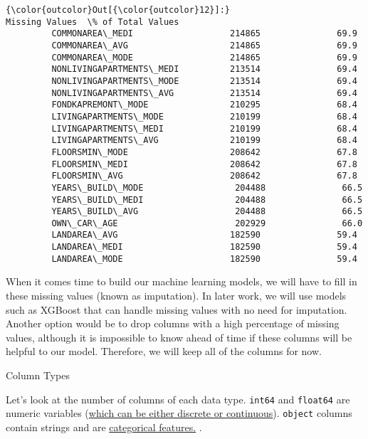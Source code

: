 \documentclass[11pt]{article}
\begin{document}
\begin{Verbatim}[commandchars=\\\{\}]
{\color{outcolor}Out[{\color{outcolor}12}]:}                           Missing Values  \% of Total Values
         COMMONAREA\_MEDI                   214865               69.9
         COMMONAREA\_AVG                    214865               69.9
         COMMONAREA\_MODE                   214865               69.9
         NONLIVINGAPARTMENTS\_MEDI          213514               69.4
         NONLIVINGAPARTMENTS\_MODE          213514               69.4
         NONLIVINGAPARTMENTS\_AVG           213514               69.4
         FONDKAPREMONT\_MODE                210295               68.4
         LIVINGAPARTMENTS\_MODE             210199               68.4
         LIVINGAPARTMENTS\_MEDI             210199               68.4
         LIVINGAPARTMENTS\_AVG              210199               68.4
         FLOORSMIN\_MODE                    208642               67.8
         FLOORSMIN\_MEDI                    208642               67.8
         FLOORSMIN\_AVG                     208642               67.8
         YEARS\_BUILD\_MODE                  204488               66.5
         YEARS\_BUILD\_MEDI                  204488               66.5
         YEARS\_BUILD\_AVG                   204488               66.5
         OWN\_CAR\_AGE                       202929               66.0
         LANDAREA\_AVG                      182590               59.4
         LANDAREA\_MEDI                     182590               59.4
         LANDAREA\_MODE                     182590               59.4
\end{Verbatim}
            
    When it comes time to build our machine learning models, we will have to
fill in these missing values (known as imputation). In later work, we
will use models such as XGBoost that can handle missing values with no
need for imputation. Another option would be to drop columns with a high
percentage of missing values, although it is impossible to know ahead of
time if these columns will be helpful to our model. Therefore, we will
keep all of the columns for now.

    Column Types

    Let's look at the number of columns of each data type. \texttt{int64}
and \texttt{float64} are numeric variables
(\href{https://stats.stackexchange.com/questions/206/what-is-the-difference-between-discrete-data-and-continuous-data}{which
can be either discrete or continuous}). \texttt{object} columns contain
strings and are
\href{http://support.minitab.com/en-us/minitab-express/1/help-and-how-to/modeling-statistics/regression/supporting-topics/basics/what-are-categorical-discrete-and-continuous-variables/}{categorical
features.} .
\end{document}
